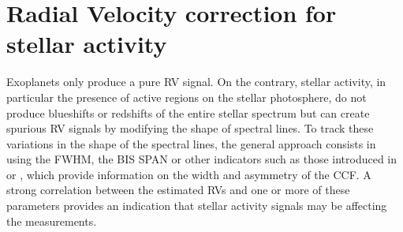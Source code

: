 \documentclass{aa}
\begin{document}
\section{Radial Velocity correction for stellar activity} \label{sec:31}

Exoplanets only produce a pure RV signal. On the contrary, stellar activity, in particular the presence of active regions on the stellar photosphere, do not produce blueshifts or redshifts of the entire stellar spectrum but can create spurious RV signals by modifying the shape of spectral lines.
To track these variations in the shape of the spectral lines, the general approach consists in using the FWHM, the BIS SPAN or other indicators such as those introduced in \citet{Boisse-2011} or \citet{Figueira-2013}, which provide information on the width and asymmetry of the CCF. A strong correlation between the estimated RVs and one or more of these parameters provides an indication that stellar activity signals may be affecting the measurements.
\end{document}
